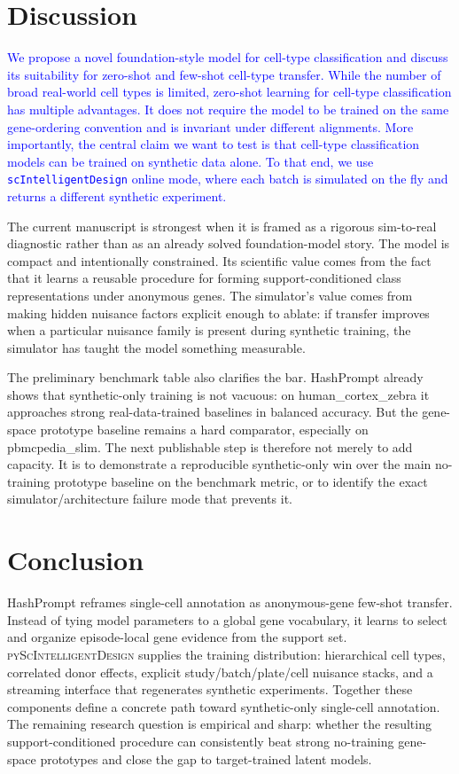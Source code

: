 \documentclass{article}
\newcommand{\phflo}[1]{\textcolor{blue}{#1}}
\begin{document}
\section{Discussion}

\phflo{We propose a novel foundation-style model for cell-type classification and discuss its suitability for zero-shot and few-shot cell-type transfer. While the number of broad real-world cell types is limited, zero-shot learning for cell-type classification has multiple advantages. It does not require the model to be trained on the same gene-ordering convention and is invariant under different alignments. More importantly, the central claim we want to test is that cell-type classification models can be trained on synthetic data alone. To that end, we use \texttt{scIntelligentDesign} online mode, where each batch is simulated on the fly and returns a different synthetic experiment.}

The current manuscript is strongest when it is framed as a rigorous sim-to-real diagnostic rather than as an already solved foundation-model story. The model is compact and intentionally constrained. Its scientific value comes from the fact that it learns a reusable procedure for forming support-conditioned class representations under anonymous genes. The simulator's value comes from making hidden nuisance factors explicit enough to ablate: if transfer improves when a particular nuisance family is present during synthetic training, the simulator has taught the model something measurable.

The preliminary benchmark table also clarifies the bar. HashPrompt already shows that synthetic-only training is not vacuous: on human\_cortex\_zebra it approaches strong real-data-trained baselines in balanced accuracy. But the gene-space prototype baseline remains a hard comparator, especially on pbmcpedia\_slim. The next publishable step is therefore not merely to add capacity. It is to demonstrate a reproducible synthetic-only win over the main no-training prototype baseline on the benchmark metric, or to identify the exact simulator/architecture failure mode that prevents it.

\section{Conclusion}

HashPrompt reframes single-cell annotation as anonymous-gene few-shot transfer. Instead of tying model parameters to a global gene vocabulary, it learns to select and organize episode-local gene evidence from the support set. \textsc{pyScIntelligentDesign} supplies the training distribution: hierarchical cell types, correlated donor effects, explicit study/batch/plate/cell nuisance stacks, and a streaming interface that regenerates synthetic experiments. Together these components define a concrete path toward synthetic-only single-cell annotation. The remaining research question is empirical and sharp: whether the resulting support-conditioned procedure can consistently beat strong no-training gene-space prototypes and close the gap to target-trained latent models.



\end{document}
